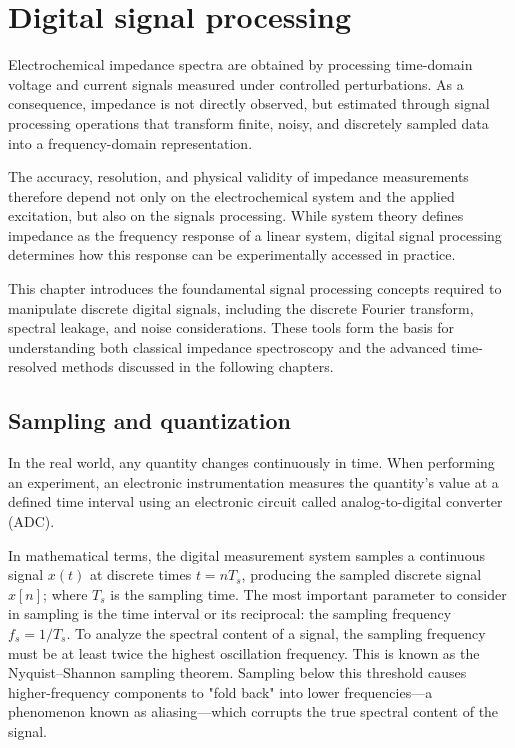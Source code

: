 \chapter{Digital signal processing}
\label{ch:digital_signal_proc}
Electrochemical impedance spectra are obtained by processing time-domain voltage and current signals measured under controlled perturbations.
As a consequence, impedance is not directly observed, but estimated through signal processing operations that transform finite, noisy, and discretely sampled data into a frequency-domain representation.

The accuracy, resolution, and physical validity of impedance measurements therefore depend not only on the electrochemical system and the applied excitation, but also on the signals processing.
While system theory defines impedance as the frequency response of a linear system, digital signal processing determines how this response can be experimentally accessed in practice.

This chapter introduces the foundamental signal processing concepts required to manipulate discrete digital signals, including the discrete Fourier transform, spectral leakage, and noise considerations.
These tools form the basis for understanding both classical impedance spectroscopy and the advanced time-resolved methods discussed in the following chapters.

\section{Sampling and quantization}
In the real world, any quantity changes continuously in time. 
When performing an experiment, an electronic instrumentation measures the quantity's value at a defined time interval using an electronic circuit called analog-to-digital converter (ADC).

In mathematical terms, the digital measurement system samples a continuous signal $x(t)$ at discrete times $t=nT_s$, producing the sampled discrete signal $x[n]$; where $T_s$ is the sampling time. 
The most important parameter to consider in sampling is the time interval or its reciprocal: the sampling frequency $f_s = 1/T_s$.
To analyze the spectral content of a signal, the sampling frequency must be at least twice the highest oscillation frequency. This is known as the Nyquist--Shannon sampling theorem. Sampling below this threshold causes higher-frequency components to "fold back" into lower frequencies—a phenomenon known as aliasing—which corrupts the true spectral content of the signal.

